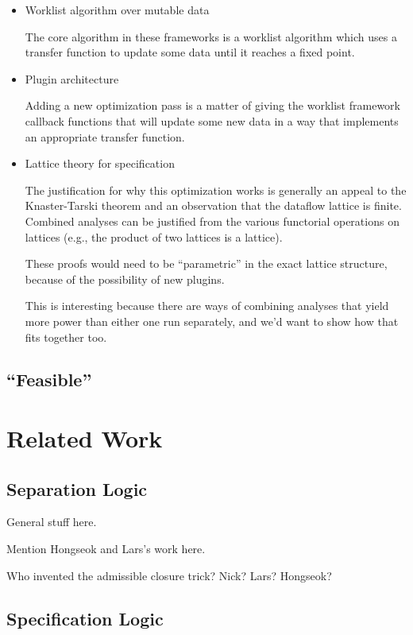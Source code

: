 \begin{itemize}
\item Worklist algorithm over mutable data

The core algorithm in these frameworks is a worklist algorithm which
uses a transfer function to update some data until it reaches a fixed
point.

\item Plugin architecture

Adding a new optimization pass is a matter of giving the worklist
framework callback functions that will update some new data in a way
that implements an appropriate transfer function.


\item Lattice theory for specification

The justification for why this optimization works is generally an
appeal to the Knaster-Tarski theorem and an observation that the
dataflow lattice is finite. Combined analyses can be justified from
the various functorial operations on lattices (e.g., the product of
two lattices is a lattice). 

These proofs would need to be ``parametric'' in the exact lattice
structure, because of the possibility of new plugins.


This is interesting because there are ways of combining analyses that
yield more power than either one run separately, and we'd want to
show how that fits together too. 

\end{itemize}

\subsection{``Feasible''}



\section{Related Work}

\subsection{Separation Logic}

General stuff here. 

Mention Hongseok and Lars's work here. 

Who invented the admissible closure trick? Nick? Lars? Hongseok?

\subsection{Specification Logic}


